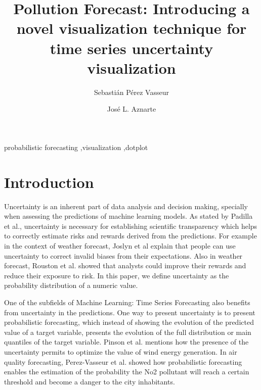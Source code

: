 \documentclass[a4paper,3p,sort&compress]{elsarticle}
\begin{document}
\linenumbers

\newcommand{\no}{NO\textsubscript{2}\xspace}

\begin{frontmatter}

  \title{Pollution Forecast: Introducing a novel visualization technique for time series uncertainty visualization}


  \author{Sebasti\'an P\'erez Vasseur}
  \author{Jos\'e L. Aznarte}
  \address{Artificial Intelligence Department\\Universidad Nacional de
    Educaci\'on a Distancia --- UNED\\c/ Juan del Rosal, 16, Madrid, Spain}
  

\begin{abstract}
  
\end{abstract}

\begin{keyword}
probabilistic forecasting \sep visualization \sep dotplot
\end{keyword}

\end{frontmatter}


\section{Introduction}
\label{sec:intro}

Uncertainty is an inherent part of data analysis and decision making, specially when assessing the predictions 
of machine learning models. As stated by Padilla et al., uncertainty is necessary for establishing 
scientific transparency which helps to correctly estimate risks and rewards
derived from the predictions. For example in the context of weather forecast, Joslyn et al explain 
that people can use uncertainty to correct invalid biases from their expectations.
Also in weather forecast, Rouston et al. 
\cite{roulston_laboratory_2006} showed that analysts could improve their rewards and reduce their exposure 
to risk. In this paper, we define uncertainty as the probability distribution of a numeric value.

One of the subfields of Machine Learning: Time Series Forecasting also benefits from uncertainty in the predictions.
One way to present uncertainty is to present probabilistic forecasting, which instead of showing the evolution 
of the predicted value of a target variable, presents the evolution of the full distribution or main quantiles 
of the target variable. Pinson et al. mentions how the presence of the uncertainty permits to optimize the value 
of wind energy generation. In air quality forecasting, Perez-Vasseur et al. showed how probabilistic forecasting 
enables the estimation of the probability the No2 pollutant will reach a certain threshold and become a danger 
to the city inhabitants.
\end{document}
